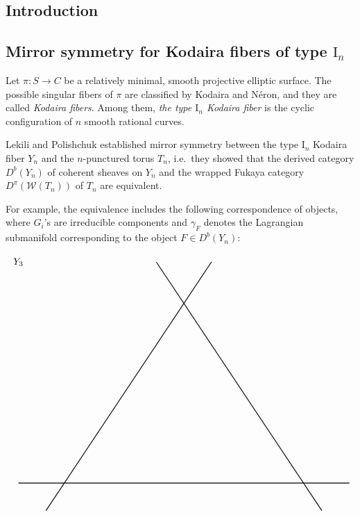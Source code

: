 \documentclass[a0,landscape]{a0poster}
\theoremstyle{plain}
\theoremstyle{definition}
\begin{document}
\large
\begin{multicols}{3} %





    \color{NavyBlue}\section{Introduction}

    \color{DarkSlateGray} %
    \subsection{Mirror symmetry for Kodaira fibers of type $\textrm{I}_n$}
    Let $\pi \colon S \to C$ be a relatively minimal, smooth projective elliptic surface.
    The possible singular fibers of $\pi$ are classified by Kodaira and N\'{e}ron, and they are called \textit{Kodaira fibers}.
    Among them, \textit{the type $\textrm{I}_n$ Kodaira fiber} is the cyclic configuration of $n$ smooth rational curves.

    Lekili and Polishchuk \cite{MR3663596} established mirror symmetry between the type $\textrm{I}_n$ Kodaira fiber $Y_n$ and the $n$-punctured torus $T_n$, i.e.~they showed that the derived category $D^b(Y_n)$ of coherent sheaves on $Y_n$ and the wrapped Fukaya category $D^\pi(\mathcal{W}(T_n))$ of $T_n$ are equivalent.

    For example, the equivalence includes the following correspondence of objects, where $G_i$'s are irreducible components and $\gamma_F$ denotes the Lagrangian submanifold corresponding to the object $F \in D^b(Y_n)$:
    \begin{center}
        \centering
        \begin{displaymath}
            \begin{tikzpicture}
                \draw(-10, 8) node{$Y_3$};
                \draw[thick] (-9,-1)--(-3,8);
                \draw[thick] (-10,0)--(2,0);
                \draw[thick] (1,-1)--(-5,8);


\end{tikzpicture}
\end{displaymath}
\end{center}
\end{multicols}
\end{document}
